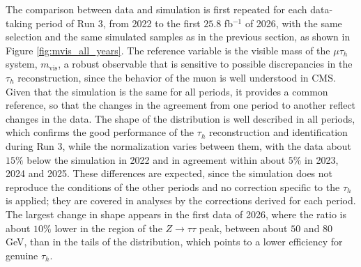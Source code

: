 The comparison between data and simulation is first repeated for each data-taking period of Run 3, from 2022 to the first $25.8$ fb$^{-1}$ of 2026, with the same selection and the same simulated samples as in the previous section, as shown in Figure \ref{fig:mvis_all_years}. The reference variable is the visible mass of the $\mu\tau_h$ system, $m_\text{vis}$, a robust observable that is sensitive to possible discrepancies in the $\tau_h$ reconstruction, since the behavior of the muon is well understood in CMS. Given that the simulation is the same for all periods, it provides a common reference, so that the changes in the agreement from one period to another reflect changes in the data. The shape of the distribution is well described in all periods, which confirms the good performance of the $\tau_h$ reconstruction and identification during Run 3, while the normalization varies between them, with the data about $15\%$ below the simulation in 2022 and in agreement within about $5\%$ in 2023, 2024 and 2025. These differences are expected, since the simulation does not reproduce the conditions of the other periods and no correction specific to the $\tau_h$ is applied; they are covered in analyses by the corrections derived for each period. The largest change in shape appears in the first data of 2026, where the ratio is about $10\%$ lower in the region of the $Z\to\tau\tau$ peak, between about $50$ and $80$ GeV, than in the tails of the distribution, which points to a lower efficiency for genuine $\tau_h$.
%
%
